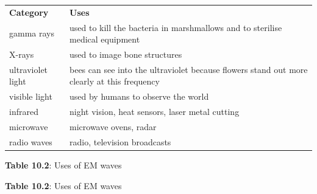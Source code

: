           \begin{table}[H]
        \begin{center}
      \label{m38778*uid9}
    \noindent
      \tablelasttail{}
      \begin{xtabular}[t]{|l|l|}\hline
                \textbf{Category}
               &
                \textbf{Uses}
     \tabularnewline{}
        gamma rays &
        used to kill the bacteria in marshmallows and to sterilise medical equipment%
     \tabularnewline{}
        X-rays &
        used to image bone structures%
     \tabularnewline{}
        ultraviolet light &
        bees can see into the ultraviolet because flowers stand out more clearly at this frequency%
     \tabularnewline{}
        visible light &
        used by humans to observe the world%
     \tabularnewline{}
        infrared &
        night vision, heat sensors, laser metal cutting%
     \tabularnewline{}
        microwave &
        microwave ovens, radar%
     \tabularnewline{}
        radio waves &
        radio, television broadcasts%
     \tabularnewline{}
    \end{xtabular}
      \end{center}
    \begin{center}{\small\bfseries Table 10.2}: Uses of EM waves\end{center}
    \begin{caption}{\small\bfseries Table 10.2}: Uses of EM waves\end{caption}
\end{table}
